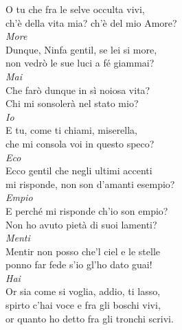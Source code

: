 \documentclass[12pt, twocolumn]{text-translation}
\begin{document}
O tu che fra le selve occulta vivi, \\
ch'è della vita mia? ch'è del mio Amore? \\
\hspace*{1cm}\textit{More} \\
Dunque, Ninfa gentil, se lei si more, \\
non vedrò le sue luci a fé giammai? \\
\hspace*{1cm}\textit{Mai} \\
Che farò dunque in sì noiosa vita? \\
Chi mi sonsolerà nel stato mio? \\
\hspace*{1cm}\textit{Io} \\
E tu, come ti chiami, miserella, \\
che mi consola voi in questo speco? \\
\hspace*{1cm}\textit{Eco} \\
Ecco gentil che negli ultimi accenti \\
mi risponde, non son d'amanti esempio? \\
\hspace*{1cm}\textit{Empio} \\
E perché mi risponde ch'io son empio? \\
Non ho avuto pietà di suoi lamenti? \\
\hspace*{1cm}\textit{Menti} \\
Mentir non posso che'l ciel e le stelle \\
ponno far fede s'io gl'ho dato guai! \\
\hspace*{1cm}\textit{Hai} \\
Or sia come si voglia, addio, ti lasso, \\
spirto c'hai voce e fra gli boschi vivi, \\
or quanto ho detto fra gli tronchi scrivi.
\end{document}
